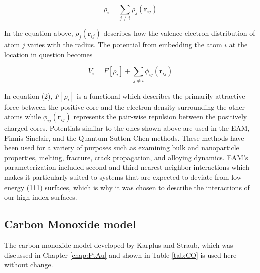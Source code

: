 \begin{equation}
\rho_{i} = \sum_{j \ne i}\rho_{j}(\mathbf{r}_{ij})
\end{equation}

In the equation above, $\rho_{j}(\mathbf{r}_{ij})$ describes how the valence
electron distribution of atom $j$ varies with the radius.  The potential from
embedding the atom $i$ at the location in question becomes

\begin{equation}
V_{i} = F[\rho_{i}] + \sum_{j \ne i} \phi_{ij}(\mathbf{r}_{ij})
\end{equation}

In equation (2), $F[\rho_{i}]$ is a functional which describes the primarily
attractive force between the positive core and the electron density surrounding
the other atoms while $\phi_{ij}(\mathbf{r}_{ij})$ represents the pair-wise
repulsion between the positively charged cores.  Potentials similar to the ones
shown above are used in the EAM, Finnis-Sinclair, and the Quantum Sutton Chen
methods.  These methods have been used for a variety of purposes such as
examining bulk and nanoparticle properties, \citep{Chui:2003fk, Wang:2005qy,
Medasani:2007uq, Mishin:1999ew} melting,\citep{Belonoshko:2000jk,
Sankaranarayanan:2006ye, Sankaranarayanan:2005bh} fracture,
\citep{Shastry:1996qg, Shastry:1998dx, Mishin:2001qt} crack propagation,
\citep{Becquart:1993sr} and alloying dynamics.  \citep{Shibata:2002hh,
Mishin:2002if, Zope:2003ai, Mishin:2005vc} EAM's parameterization included
second and third nearest-neighbor interactions which makes it particularly
suited to systems that are expected to deviate from low-energy (111) surfaces,
which is why it was chosen to describe the  interactions of
our high-index surfaces.  \citep{Foiles:1986ky} 

\subsection{Carbon Monoxide model}
The carbon monoxide model developed by Karplus and Straub\citep{Straub:1991no},
which was discussed in Chapter \ref{chap:PtAu} and shown in Table \ref{tab:CO}
is used here without change.

